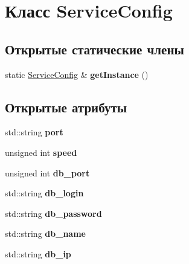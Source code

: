 \hypertarget{classServiceConfig}{}\section{Класс Service\+Config}
\label{classServiceConfig}
\subsection*{Открытые статические члены}
\begin{DoxyCompactItemize}
\item 
\mbox{\label{classServiceConfig_ab315cb7fa419f5ee087de0096a18a6f1}} 
static \hyperlink{classServiceConfig}{Service\+Config} \& {\bfseries get\+Instance} ()
\end{DoxyCompactItemize}
\subsection*{Открытые атрибуты}
\begin{DoxyCompactItemize}
\item 
\mbox{\label{classServiceConfig_ad7dbd44a4f1da4b1eaabdc4d9b82d82f}} 
std\+::string {\bfseries port}
\item 
\mbox{\label{classServiceConfig_a0768b5e81dc7dbe44875c68aaf5eead5}} 
unsigned int {\bfseries speed}
\item 
\mbox{\label{classServiceConfig_a49a89e3556cb42ef6683cdb63504d404}} 
unsigned int {\bfseries db\+\_\+port}
\item 
\mbox{\label{classServiceConfig_a2b8d0ebb3f0db844cd70f40194a0c4d1}} 
std\+::string {\bfseries db\+\_\+login}
\item 
\mbox{\label{classServiceConfig_a7ebff3943d2707fd0d8dc7ca303259bc}} 
std\+::string {\bfseries db\+\_\+password}
\item 
\mbox{\label{classServiceConfig_aea90021c2bb6e954b724a06ed59cef05}} 
std\+::string {\bfseries db\+\_\+name}
\item 
\mbox{\label{classServiceConfig_acdb91b5aec9a19af051f0b9adc264865}} 
std\+::string {\bfseries db\+\_\+ip}
\end{DoxyCompactItemize}
